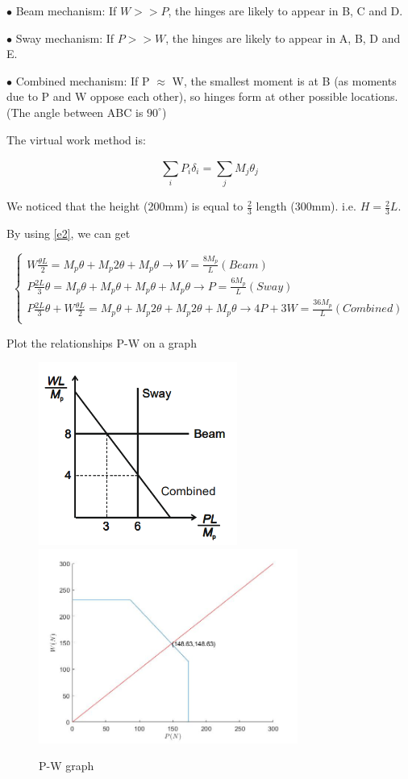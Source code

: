 $\bullet$ Beam mechanism: If $W>>P$, the hinges are likely to appear in B, C and D.



$\bullet$ Sway mechanism: If $P>>W$, the hinges are likely to appear in A, B, D and E.




$\bullet$ Combined mechanism: If P $\approx$ W, the smallest moment
is at B (as moments due to P
and W oppose each other), so
hinges form at other possible
locations. (The angle between ABC is $90^\circ$)

The virtual work method is: 

\begin{equation}
    \sum_i^{}{P_i\delta_i}=\sum_j^{}{M_j\theta_j}
    \label{e2}
\end{equation}

We noticed that the height (200mm) is equal to $\frac{2}{3}$ length (300mm). i.e. $H=\frac{2}{3}L$.

By using \autoref{e2}, we can get

$$
\left\{ \begin{array}{l}
	W\frac{\theta L}{2}=M_p\theta+M_p2\theta+M_p\theta \rightarrow W=\frac{8M_p}{L} (Beam)\\
	P\frac{2L}{3}\theta=M_p\theta+M_p\theta+M_p\theta+M_p\theta \rightarrow P=\frac{6M_p}{L} (Sway)\\
	P\frac{2L}{3}\theta+W\frac{\theta L}{2}=M_p\theta+M_p2\theta+M_p2\theta+M_p\theta \rightarrow 4P+3W=\frac{36M_p}{L} (Combined)\\
\end{array} \right. 
$$

Plot the relationships P-W on a graph

\begin{figure}[htbp]
    \centering
    \includegraphics[width=6.5cm]{./fig/14.png}
    \includegraphics[width=8.5cm]{./fig/15.jpg}
    \caption{P-W graph}
    \label{f3}
\end{figure}



